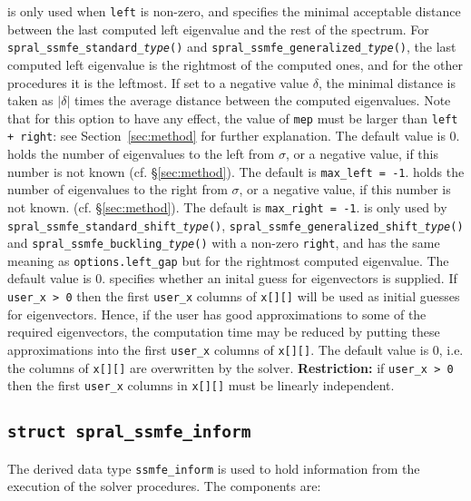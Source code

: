 \begin{description}
%
is only used when
{\tt left} is non-zero, and
specifies the minimal acceptable distance
between the last computed left eigenvalue
and the rest of the spectrum.
For {\tt spral\_ssmfe\_standard\_\textit{type}()} and
{\tt spral\_ssmfe\_generalized\_\textit{type}()},
the last computed left eigenvalue
is the rightmost of the computed ones,
and for the other procedures
it is the leftmost.
If set to a negative value $\delta$,
the minimal distance is taken as
$|\delta|$ times the average distance between the computed eigenvalues.
Note that for this option to have any effect,
the value of {\tt mep} must be larger than
{\tt left + right}: see Section~\ref{sec:method}
for further explanation.
The default value is 0.
%
holds the number of eigenvalues to the left from $\sigma$,
or a negative value, if this number is not known
(cf. \S\ref{sec:method}).
The default is {\tt max\_left = -1}.
%
holds the number of eigenvalues to the right from $\sigma$,
or a negative value, if this number is not known.
(cf. \S\ref{sec:method}).
The default is {\tt max\_right = -1}.
%
is only used by 
{\tt spral\_ssmfe\_standard\_shift\_\textit{type}()},
{\tt spral\_ssmfe\_generalized\_shift\_\textit{type}()}
and {\tt spral\_ssmfe\_buckling\_\textit{type}()}
with a non-zero {\tt right}, and
has the same meaning as {\tt options.left\_gap}
but for the rightmost computed eigenvalue.
The default value is 0.
%
 specifies whether an inital guess for eigenvectors is supplied.
If {\tt user\_x > 0} then the first {\tt user\_x} columns
of {\tt x[][]} will be used as initial guesses for eigenvectors.
Hence, if the user has good approximations
to some of the required eigenvectors, the computation time
may be reduced by putting these approximations
into the first {\tt user\_x} columns of {\tt x[][]}.
The default value is 0, 
i.e. the columns of {\tt x[][]} are overwritten by the solver.
{\bf Restriction:} if {\tt user\_x > 0} then
the first {\tt user\_x} columns in {\tt x[][]}
must be linearly independent.
%
\end{description}

\subsection{\texttt{struct spral\_ssmfe\_inform}}

\label{sec:inform}

The derived data type {\tt ssmfe\_inform} is used
to hold information from the execution of
the solver procedures.
The components are:

